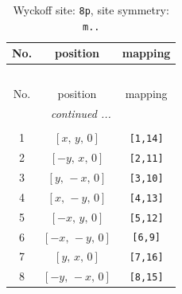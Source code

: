 \documentclass[fleqn,8pt]{jsarticle}
\begin{document}
\renewcommand{\arraystretch}{1.2}
\begin{longtable}{ccc}
\caption{Wyckoff site: {\tt 8p}, site symmetry: {\tt m..}}
 \\
 \hline \hline
No. & position & mapping \\ \hline \endfirsthead

\multicolumn{2}{l}{\tablename\ \thetable{}} \\
 \hline \hline
No. & position & mapping \\ \hline \endhead

 \hline \hline
\multicolumn{2}{r}{\footnotesize\it continued ...} \\ \endfoot

 \hline \hline
\multicolumn{2}{r}{} \\ \endlastfoot

1 & $\left[ x,\, y,\, 0 \right]$ & {\tt [1,14]} \\ \hline
2 & $\left[ - y,\, x,\, 0 \right]$ & {\tt [2,11]} \\ \hline
3 & $\left[ y,\, - x,\, 0 \right]$ & {\tt [3,10]} \\ \hline
4 & $\left[ x,\, - y,\, 0 \right]$ & {\tt [4,13]} \\ \hline
5 & $\left[ - x,\, y,\, 0 \right]$ & {\tt [5,12]} \\ \hline
6 & $\left[ - x,\, - y,\, 0 \right]$ & {\tt [6,9]} \\ \hline
7 & $\left[ y,\, x,\, 0 \right]$ & {\tt [7,16]} \\ \hline
8 & $\left[ - y,\, - x,\, 0 \right]$ & {\tt [8,15]} \\
\end{longtable}
\renewcommand{\arraystretch}{1.2}
\end{document}
